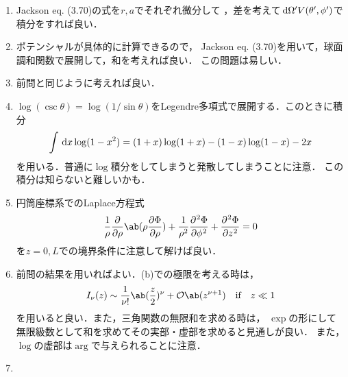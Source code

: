 \begin{enumerate}[%
  label=%
  \fbox{%
   {\thesection.\arabic*}%
    },%
    ]
\begin{enumerate}[(a)]
        これらをまとめて
        \begin{gather}
          \int_0^{2\pi} \dl{\phi} V(\phi) e^{-\i m \phi} = 
          \begin{dcases}
            - \i\frac{4Vn}{m} & \text{if}\qq m = \pm n, \pm 3n, \ldots\\
            \qq 0 &\text{otherwise}
          \end{dcases}
        \end{gather}
        と書ける．
      \item (a)の結果を用いて具体的に計算を進めていくだけであるが，
        Jackson §3.3 eq. (3.36)との比較の時には座標軸の取り方に気をつける必要がある．
        具体的には，$\cos\theta' = \sin\theta \sin \phi$とすれば良い．
    \end{enumerate}
  \item Jackson eq. (3.70)の式を$r, a$でそれぞれ微分して
    ，差を考えて$\dl{\Omega'}V(\theta' , \phi')$で積分をすれば良い．
  \item ポテンシャルが具体的に計算できるので，
    Jackson eq. (3.70)を用いて，球面調和関数で展開して，和を考えれば良い．
    この問題は易しい．
  \item 前問と同じように考えれば良い．
  \item $\log(\csc\theta) = \log(1/\sin\theta)$をLegendre多項式で展開する．このときに積分
    \begin{gather}
      \int \dl{x} \log(1 - x^2) = (1+x)\log(1+x) - (1-x)\log(1-x) - 2x
    \end{gather}
    を用いる．普通に$\log$積分をしてしまうと発散してしまうことに注意．
    この積分は知らないと難しいかも．
  \item 円筒座標系でのLaplace方程式
    \begin{gather}
      \frac{1}{\rho}\diffp**{\rho}{\ab(\rho \diffp{\Phi}{\rho})} +%
      \frac{1}{\rho^2}\diffp[2]{\Phi}{\phi} + \diffp[2]{\Phi}{z} = 0
    \end{gather}
    を$z = 0, L$での境界条件に注意して解けば良い．
  \item 前問の結果を用いればよい．(b)での極限を考える時は，
    \begin{gather}
      I_\nu(z) \sim \frac{1}{\nu !} \ab(\frac{z}{2})^\nu %
      + \order{z^{\nu+1}} \qq \text{if} \qq z \ll 1
    \end{gather}
    を用いると良い．また，三角関数の無限和を求める時は，
    $\exp$の形にして無限級数として和を求めてその実部・虚部を求めると見通しが良い．
    また，$\log$の虚部は$\arg$で与えられることに注意．
  \item %

\end{enumerate}
